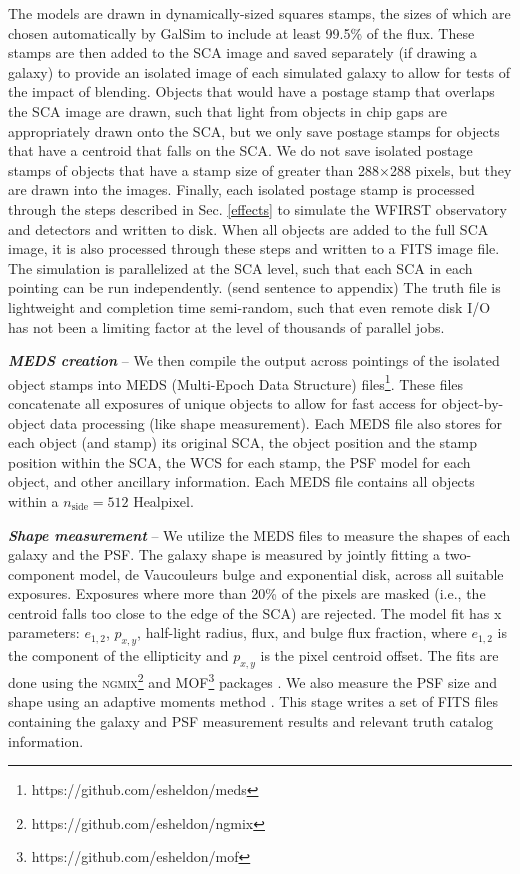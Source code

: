\documentclass[aps,prd, amsmath,amssymb,superscriptaddress,showkeys,nofootinbib,reprint,preprintnumbers]{revtex4-1}
\begin{document}
The models are drawn in dynamically-sized squares stamps, the sizes of which are chosen automatically by GalSim to include at least 99.5\% of the flux.
These stamps are then added to the SCA image and saved separately (if drawing a galaxy) to provide an isolated image of each simulated galaxy to allow for tests of the impact of blending.
Objects that would have a postage stamp that overlaps the SCA image are drawn, such that light from objects in chip gaps are appropriately drawn onto the SCA, but we only save postage stamps for objects that have a centroid that falls on the SCA. 
We do not save isolated postage stamps of objects that have a stamp size of greater than 288$\times$288 pixels, but they are drawn into the images.
Finally, each isolated postage stamp is processed through the steps described in Sec. \ref{effects} to simulate the WFIRST observatory and detectors and written to disk. When all objects are added to the full SCA image, it is also processed through these steps and written to a FITS image file.
The simulation is parallelized at the SCA level, such that each SCA in each pointing can be run independently. 
(send sentence to appendix) The truth file is lightweight and completion time semi-random, such that even remote disk I/O has not been a limiting factor at the level of thousands of parallel jobs. 

\textbf{\textit{MEDS creation}} -- We then compile the output across pointings of the isolated object stamps into MEDS (Multi-Epoch Data Structure) files\footnote{https://github.com/esheldon/meds}. 
These files concatenate all exposures of unique objects to allow for fast access for object-by-object data processing (like shape measurement). 
Each MEDS file also stores for each object (and stamp) its original SCA, the object position and the stamp position within the SCA, the WCS for each stamp, the PSF model for each object, and other ancillary information. 
Each MEDS file contains all objects within a $n_{\textrm{side}}=512$ Healpixel.

\textbf{\textit{Shape measurement}} -- We utilize the MEDS files to measure the shapes of each galaxy and the PSF. 
The galaxy shape is measured by jointly fitting a two-component model, de Vaucouleurs bulge and exponential disk, across all suitable exposures. 
Exposures where more than 20\% of the pixels are masked (i.e., the centroid falls too close to the edge of the SCA) are rejected. 
The model fit has x parameters: $e_{1,2}$, $p_{x,y}$, half-light radius, flux, and bulge flux fraction, where $e_{1,2}$ is the component of the ellipticity and $p_{x,y}$ is the pixel centroid offset. 
The fits are done using the \textsc{ngmix}\footnote{https://github.com/esheldon/ngmix} and \textsc{MOF}\footnote{https://github.com/esheldon/mof} packages \cite{2014MNRAS.444L..25S}. 
We also measure the PSF size and shape using an adaptive moments method \cite{2003MNRAS.343..459H}. 
This stage writes a set of FITS files containing the galaxy and PSF measurement results and relevant truth catalog information.
\end{document}
